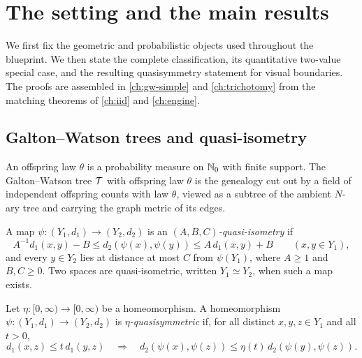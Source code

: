 \chapter{The setting and the main results}
\label{ch:prelims}

We first fix the geometric and probabilistic objects used throughout the blueprint. We then
state the complete classification, its quantitative two-value special case, and the resulting
quasisymmetry statement for visual boundaries. The proofs are assembled in
\cref{ch:gw-simple} and \cref{ch:trichotomy} from the matching theorems of
\cref{ch:iid} and \cref{ch:engine}.

\section{Galton--Watson trees and quasi-isometry}

\begin{definition}
\label{def:gw}
\leanok
An offspring law $\theta$ is a probability measure on $\mathbb{N}_0$ with finite support. The
Galton--Watson tree $\mathcal{T}$ with offspring law $\theta$ is the genealogy cut out by a field of
independent offspring counts with law $\theta$, viewed as a subtree of the ambient $N$-ary
tree and carrying the graph metric of its edges.
\end{definition}

\begin{definition}
\label{def:qi}
\leanok
A map $\psi\colon(Y_1,d_1)\to(Y_2,d_2)$ is an \emph{$(A,B,C)$-quasi-isometry} if
\[
 A^{-1}d_1(x,y)-B\leq d_2(\psi(x),\psi(y))\leq A\,d_1(x,y)+B
 \qquad(x,y\in Y_1),
\]
and every $y\in Y_2$ lies at distance at most $C$ from $\psi(Y_1)$, where $A\geq1$ and
$B,C\geq0$. Two spaces are quasi-isometric, written $Y_1\simeq Y_2$, when such a map exists.
\end{definition}

\begin{definition}[Quasisymmetry]
\label{def:qs}
Let $\eta\colon[0,\infty)\to[0,\infty)$ be a homeomorphism. A homeomorphism
$\psi\colon(Y_1,d_1)\to(Y_2,d_2)$ is \emph{$\eta$-quasisymmetric} if, for all distinct
$x,y,z\in Y_1$ and all $t>0$,
\[
 d_1(x,z)\leq t\,d_1(y,z)
 \quad\Longrightarrow\quad
 d_2(\psi(x),\psi(z))\leq\eta(t)\,d_2(\psi(y),\psi(z)).
\]
\end{definition}


